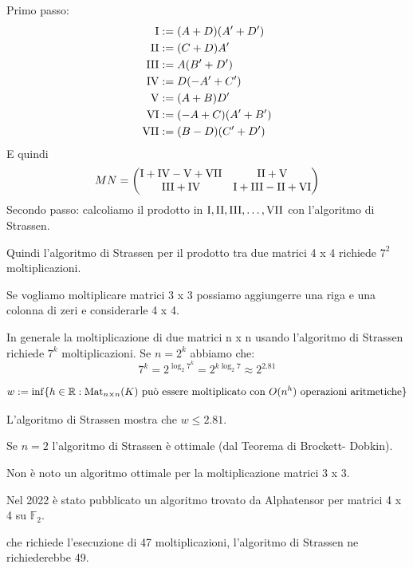 \documentclass[../main.tex]{subfiles}
\begin{document}
Primo passo:
\begin{align*}
    \Roman 1 & := (A + D)(A' + D')  \\
    \Roman 2 & := (C + D) A'        \\
    \Roman 3 & := A(B' + D')        \\
    \Roman 4 & := D(-A' + C')       \\
    \Roman 5 & := (A + B)D'         \\
    \Roman 6 & := (-A + C)(A' + B') \\
    \Roman 7 & := (B - D)(C' + D')
\end{align*}
E quindi
\begin{equation*}
    MN = \begin{pmatrix}
        \Roman 1 + \Roman 4 - \Roman 5 + \Roman 7 & \Roman 2 + \Roman 5                       \\
        \Roman 3 + \Roman 4                       & \Roman 1 + \Roman 3 - \Roman 2 + \Roman 6
    \end{pmatrix}
\end{equation*}
Secondo passo: calcoliamo il prodotto in $\Roman 1, \Roman 2, \Roman 3, \ldots , \Roman 7$ con l'algoritmo di Strassen.

Quindi l'algoritmo di Strassen per il prodotto tra due matrici 4 x 4 richiede $7^2$ moltiplicazioni.

Se vogliamo moltiplicare matrici 3 x 3 possiamo aggiungerre una riga e una colonna di zeri e considerarle 4 x 4.

In generale la moltiplicazione di due matrici n x n usando l'algoritmo di Strassen richiede $7^k$ moltiplicazioni. Se $n = 2^k$ abbiamo che:
\begin{equation*}
    7^k = 2^{\log_2 7^k}=2^{k \log_2 7} \approx 2^{2.81}
\end{equation*}

\begin{definition}
    \begin{equation*}
        w := \inf \{ h \in \mathbb{R} : \operatorname{Mat}_{n \times n}(K) \text{ può essere moltiplicato con } O(n^h) \text{ operazioni aritmetiche} \}
    \end{equation*}
\end{definition}

L'algoritmo di Strassen mostra che $w \leq 2.81$.

Se $n = 2$ l'algoritmo di Strassen è ottimale (dal Teorema di Brockett- Dobkin).

Non è noto un algoritmo ottimale per la moltiplicazione matrici 3 x 3.

Nel 2022 è stato pubblicato un algoritmo trovato da Alphatensor per matrici 4 x 4 su $\mathbb{F}_2$.

che richiede l'esecuzione di 47 moltiplicazioni, l'algoritmo di Strassen ne richiederebbe 49.
\end{document}
